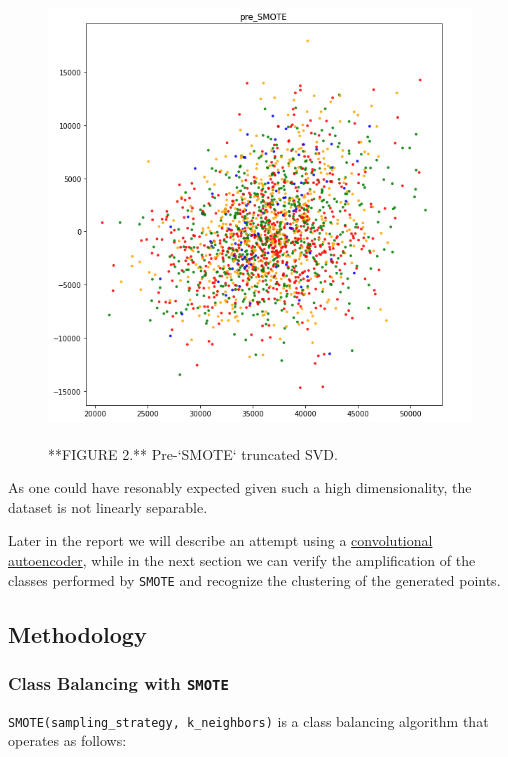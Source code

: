 \documentclass[]{article}
\begin{document}
\begin{figure}

{\centering \includegraphics[width=450px,height=450]{Images/TruncatedSVD_preSMOTE} 

}

\caption{**FIGURE 2.** Pre-`SMOTE` truncated SVD.}\label{fig:pre-smote}
\end{figure}

As one could have resonably expected given such a high dimensionality,
the dataset is not linearly separable.

Later in the report we will describe an attempt using a
\protect\hyperlink{ae}{convolutional autoencoder}, while in the next
section we can verify the amplification of the classes performed by
\texttt{SMOTE} and recognize the clustering of the generated points.

\hypertarget{methodology}{%
\subsection{\texorpdfstring{\textbf{Methodology}}{Methodology}}\label{methodology}}

\hypertarget{smote}{%
\subsubsection{\texorpdfstring{Class Balancing with
\texttt{SMOTE}}{Class Balancing with SMOTE}}\label{smote}}

\texttt{SMOTE(sampling\_strategy,\ k\_neighbors)} is a class balancing
algorithm that operates as follows:
\end{document}
